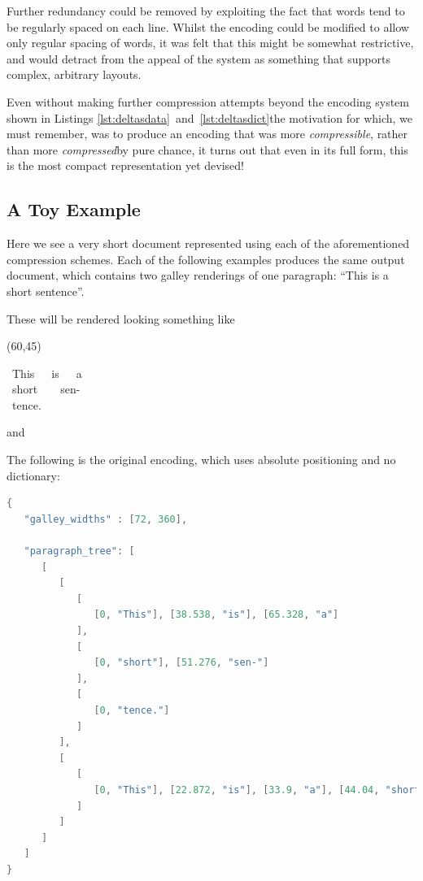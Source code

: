 Further redundancy could be removed by exploiting the fact that words tend to be regularly spaced on each line. Whilst the encoding could be modified to allow only regular spacing of words, it was felt that this might be somewhat restrictive, and would detract from the appeal of the system as something that supports complex, arbitrary layouts.

Even without making further compression attempts beyond the encoding system shown in Listings \ref{lst:deltasdata}~and~\ref{lst:deltasdict}\ed the motivation for which, we must remember, was to produce an encoding that was more \emph{compressible}, rather than more \emph{compressed}\ed by pure chance, it turns out that even in its full form, this is the most compact representation yet devised!

\clearpage
\subsection{A Toy Example}
Here we see a very short document represented using each of the aforementioned compression schemes. Each of the following examples produces the same output document, which contains two galley renderings of one paragraph: ``This is a short sentence''.

These will be rendered looking something like

{\singlespacing
\framebox(60,45){
    \parbox{60\unitlength}{\mbox{~}This~~~is~~~a\\\mbox{~}short~~~~sen-\\\mbox{~}tence.}
}}

and


\vspace{0.5in}
The following is the original encoding, which uses absolute positioning and no dictionary:

\vspace{0.5in}
\begin{lstlisting}[language=c,stringstyle=\color{blue},basicstyle=\ttfamily\footnotesize\singlespacing]
{
   "galley_widths" : [72, 360],

   "paragraph_tree": [
      [
         [
            [
               [0, "This"], [38.538, "is"], [65.328, "a"]
            ],
            [
               [0, "short"], [51.276, "sen-"]
            ],
            [
               [0, "tence."]
            ]
         ],
         [
            [
               [0, "This"], [22.872, "is"], [33.9, "a"], [44.04, "short"], [71.964, "sentence."]
            ]
         ]
      ]
   ]
}
\end{lstlisting}

